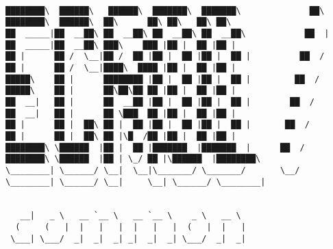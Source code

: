 \documentclass[varwidth=\maxdimen,margin=0.5cm,multi={verbatim}]{standalone}
\begin{document}
\begin{verbatim}

████████\  ██████\   ██████\  ███████\  ███████\              ██\       ████████\  ██████\  ██\      ██\ ██\   ██\ ██\
██  _____|██  __██\ ██  __██\ ██  __██\ ██  __██\            ██  |      ██  _____|██  __██\ ███\    ███ |██ |  ██ |██ |
██ |      ██ /  \__|██ /  ██ |██ |  ██ |██ |  ██ |          ██  /       ██ |      ██ /  \__|████\  ████ |██ |  ██ |██ |
█████\    ██ |      ████████ |██ |  ██ |██ |  ██ |         ██  /        █████\    ██ |      ██\██\██ ██ |██ |  ██ |██ |
██  __|   ██ |      ██  __██ |██ |  ██ |██ |  ██ |        ██  /         ██  __|   ██ |      ██ \███  ██ |██ |  ██ |██ |
██ |      ██ |  ██\ ██ |  ██ |██ |  ██ |██ |  ██ |       ██  /          ██ |      ██ |  ██\ ██ |\█  /██ |██ |  ██ |██ |
████████\ \██████  |██ |  ██ |███████  |███████  |      ██  /           ████████\ \██████  |██ | \_/ ██ |\██████  |████████\
\________| \______/ \__|  \__|\_______/ \_______/       \__/            \________| \______/ \__|     \__| \______/ \________|
                                                                                                                             
                                                                                                                             
   __|   _ \   __ `__ \   __ `__ \    _ \   __ \
  (     (   |  |   |   |  |   |   |  (   |  |   |
 \___| \___/  _|  _|  _| _|  _|  _| \___/  _|  _|



\end{verbatim}
\end{document}
